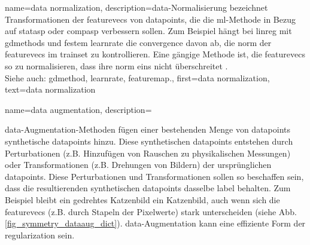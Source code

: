 {{{{
{name={data normalization},
	description={\Gls{data}-Normalisierung bezeichnet Transformationen 
		der \glspl{featurevec} von \glspl{datapoint}, die die \gls{ml}-Methode in Bezug auf \gls{statasp} oder \gls{compasp} 
		verbessern sollen. Zum Beispiel hängt bei \gls{linreg} mit \glspl{gdmethod} und festem \gls{learnrate} 
		die \gls{convergence} davon ab, die \gls{norm} der \glspl{featurevec} im \gls{trainset} zu kontrollieren. 
		Eine gängige Methode ist, die \glspl{featurevec} so zu normalisieren, dass ihre \gls{norm} eins nicht überschreitet \cite[Kap. 5]{MLBasics}.
				\\
		Siehe auch:  \gls{gdmethod}, \gls{learnrate}, \gls{featuremap}.},
	first={data normalization},
	text={data normalization}
}

{name={data augmentation},
	description={\Gls{data}-Augmentation-Methoden fügen einer bestehenden Menge von \glspl{datapoint} 
		synthetische \glspl{datapoint} hinzu. Diese synthetischen \glspl{datapoint} entstehen durch 
		Perturbationen (z.B. Hinzufügen von Rauschen zu physikalischen Messungen) oder Transformationen 
		(z.B. Drehungen von Bildern) der ursprünglichen \glspl{datapoint}. Diese Perturbationen und 
		Transformationen sollen so beschaffen sein, dass die resultierenden synthetischen \glspl{datapoint} 
		dasselbe \gls{label} behalten. Zum Beispiel bleibt ein gedrehtes Katzenbild ein Katzenbild, 
		auch wenn sich die \glspl{featurevec} (z.B. durch Stapeln der Pixelwerte) stark unterscheiden (siehe Abb. \ref{fig_symmetry_dataaug_dict}). 
		\Gls{data}-Augmentation kann eine effiziente Form der \gls{regularization} sein.
		\begin{figure}[H]
		\begin{center}
\end{center}
\end{figure}}}}}}}
